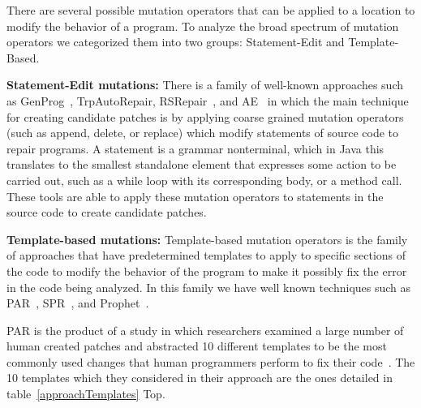\documentclass[conference]{IEEEtran}
\begin{document}
There are several possible mutation operators that can be applied to a location 
to modify the behavior of a program. To analyze the broad 
spectrum of mutation operators we categorized them into two groups: 
Statement-Edit and Template-Based. 

\textbf{Statement-Edit mutations:}
There is a family of well-known approaches such as GenProg~\cite{legoues12}, 
TrpAutoRepair\cite{Qi13}, RSRepair~\cite{Qi14}, and AE~\cite{Weimer13} in which the main technique for 
creating candidate 
patches is by applying coarse grained mutation operators (such as append, delete, or 
replace) which modify statements of source code to 
repair programs. A statement is  a grammar nonterminal, which in Java this translates to the smallest standalone element that expresses 
some action to be carried out, such as a while loop with its corresponding body, or a method call. These tools are able to 
apply these mutation operators to statements in the source code to 
create candidate patches.

\textbf{Template-based mutations:}
Template-based mutation operators is the family of approaches that have 
predetermined templates to apply to specific sections of the code to 
modify the behavior of the program to make it possibly fix the error in the 
code being analyzed. In this family we have well known techniques such as PAR~\cite{kim2013}, 
SPR~\cite{fan15}, and 
Prophet~\cite{Long2016}.
 
PAR is the product of a study in which researchers examined a large number of 
human 
created patches and abstracted 10 different templates to be the most 
commonly used changes that human programmers perform to fix their 
code~\cite{kim2013}.
The 10 templates which they considered in their approach are the ones detailed in table~\ref{approachTemplates} Top.
\end{document}
